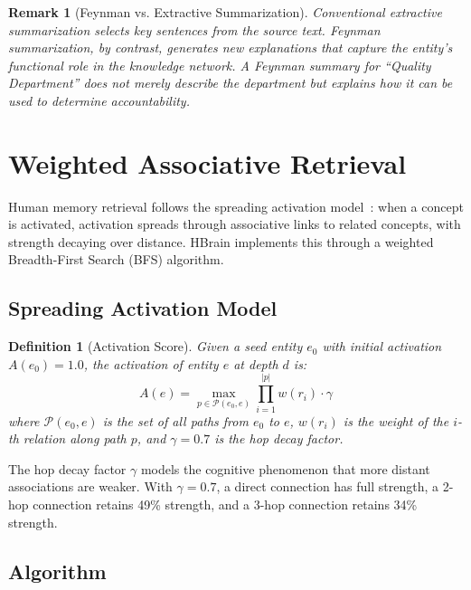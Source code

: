 \documentclass[11pt]{article}
\newtheorem{definition}{Definition}
\newtheorem{remark}{Remark}
\begin{document}
\begin{remark}[Feynman vs. Extractive Summarization]
Conventional extractive summarization selects key sentences from the source text. Feynman summarization, by contrast, generates new explanations that capture the entity's \textit{functional role} in the knowledge network. A Feynman summary for ``Quality Department'' does not merely describe the department but explains how it can be used to determine accountability.
\end{remark}

\section{Weighted Associative Retrieval}
\label{sec:retrieval}

Human memory retrieval follows the spreading activation model~\cite{anderson1983architecture}: when a concept is activated, activation spreads through associative links to related concepts, with strength decaying over distance. HBrain implements this through a weighted Breadth-First Search (BFS) algorithm.

\subsection{Spreading Activation Model}

\begin{definition}[Activation Score]
Given a seed entity $e_0$ with initial activation $A(e_0) = 1.0$, the activation of entity $e$ at depth $d$ is:
\begin{equation}
A(e) = \max_{p \in \mathcal{P}(e_0, e)} \prod_{i=1}^{|p|} w(r_i) \cdot \gamma
\label{eq:activation}
\end{equation}
where $\mathcal{P}(e_0, e)$ is the set of all paths from $e_0$ to $e$, $w(r_i)$ is the weight of the $i$-th relation along path $p$, and $\gamma = 0.7$ is the hop decay factor.
\end{definition}

The hop decay factor $\gamma$ models the cognitive phenomenon that more distant associations are weaker. With $\gamma = 0.7$, a direct connection has full strength, a 2-hop connection retains 49\% strength, and a 3-hop connection retains 34\% strength.

\subsection{Algorithm}
\end{document}
